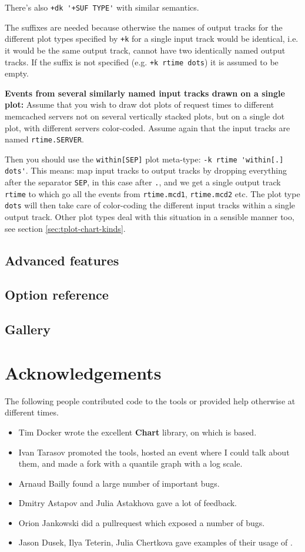 \documentclass{article}
\begin{document}
There's also \verb|+dk '+SUF TYPE'| with similar semantics. 

The suffixes are needed because otherwise the names of output tracks for the different plot types specified by \verb|+k| for a single input track would be identical, i.e. it would be the same output track, \timeplot{} cannot have two identically named output tracks. If the suffix is not specified (e.g. \verb|+k rtime dots|) it is assumed to be empty.

\textbf{Events from several similarly named input tracks drawn on a single plot:} Assume that you wish to draw dot plots of request times to different memcached servers not on several vertically stacked plots, but on a single dot plot, with different servers color-coded. Assume again that the input tracks are named \verb|rtime.SERVER|. 

Then you should use the \verb|within[SEP]| plot meta-type: \verb|-k rtime 'within[.] dots'|. This means: map input tracks to output tracks by dropping everything after the separator \verb|SEP|, in this case after \verb|.|, and we get a single output track \verb|rtime| to which go all the events from \verb|rtime.mcd1|, \verb|rtime.mcd2| etc. The plot type \verb|dots| will then take care of color-coding the different input tracks within a single output track. Other plot types deal with this situation in a sensible manner too, see section \ref{sec:tplot-chart-kinds}.

\subsection{Advanced features}

\subsection{Option reference}

\subsection{Gallery}

\section{Acknowledgements}

The following people contributed code to the tools or provided help otherwise at different times.
\begin{itemize}
\item Tim Docker wrote the excellent \textbf{Chart} library, on which \timeplot{} is based.
\item Ivan Tarasov promoted the tools, hosted an event where I could talk about them, and made a fork with a quantile graph with a log scale.
\item Arnaud Bailly found a large number of important bugs.
\item Dmitry Astapov and Julia Astakhova gave a lot of feedback.
\item Orion Jankowski did a pullrequest which exposed a number of bugs.
\item Jason Dusek, Ilya Teterin, Julia Chertkova gave examples of their usage of \timeplot{}.
\end{itemize}
\end{document}
